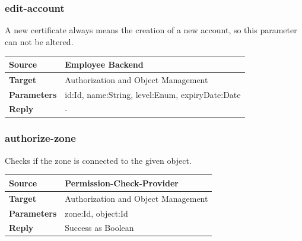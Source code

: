 \documentclass[12pt,a4paper,titlepage,oneside]{scrartcl}
\begin{document}
\subsubsection{edit-account}

A new certificate always means the creation of a new account, so this parameter can not be altered.

\begin{table}[h]

    \centering

    \begin{tabular}{|l|p{12cm}|} \hline

    \textbf{Source}&Employee Backend\\ \hline

    \textbf{Target}&Authorization and Object Management\\ \hline

    \textbf{Parameters}&id:Id, name:String, level:Enum, expiryDate:Date\\ \hline

    \textbf{Reply}&-\\ \hline

    \end{tabular}

\end{table}

\subsubsection{authorize-zone}

Checks if the zone is connected to the given object.

\begin{table}[h]

    \centering

    \begin{tabular}{|l|p{12cm}|} \hline

    \textbf{Source}&Permission-Check-Provider\\ \hline

    \textbf{Target}&Authorization and Object Management\\ \hline

    \textbf{Parameters}&zone:Id, object:Id\\ \hline

    \textbf{Reply}&Success as Boolean\\ \hline

    \end{tabular}

\end{table}
\end{document}
